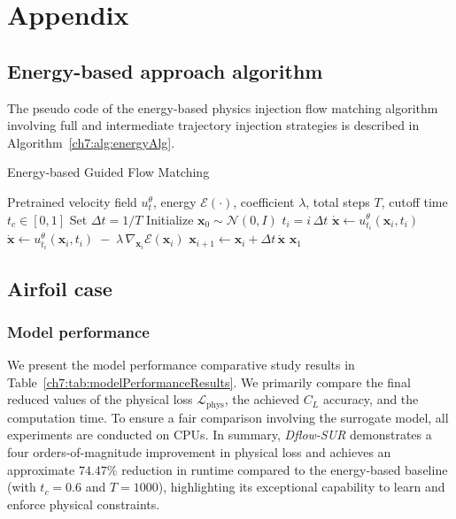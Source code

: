 \section{Appendix}
\subsection{Energy-based approach algorithm}
\label{ch7:sect:App_energyBasedAlg}

The pseudo code of the energy-based physics injection flow matching algorithm involving full and intermediate trajectory injection strategies is described in Algorithm~\ref{ch7:alg:energyAlg}.

\begin{algorithm}[H]
\caption{Energy-based Guided Flow Matching}
\begin{algorithmic}[1]
\Require Pretrained velocity field $u_t^\theta$, energy $\mathcal{E}(\cdot)$, coefficient $\lambda$, total steps $T$, cutoff time $t_c\in[0,1]$
\State Set $\Delta t = 1/T$
\State Initialize $\mathbf{x}_0 \sim \mathcal{N}(0,I)$
    \State $t_i = i\,\Delta t$
        \State $\dot{\mathbf{x}} \leftarrow u_{t_i}^\theta(\mathbf{x}_i, t_i)$
    \Else
        \State $\dot{\mathbf{x}} \leftarrow u_{t_i}^\theta(\mathbf{x}_i, t_i)\;-\;\lambda\,\nabla_{\mathbf{x}_i}\mathcal{E}(\mathbf{x}_i)$
    \EndIf
    \State $\mathbf{x}_{i+1} \leftarrow \mathbf{x}_i + \Delta t\,\dot{\mathbf{x}}$
\EndFor
\State \Return $\mathbf{x}_1$
\end{algorithmic}
\label{ch7:alg:energyAlg}
\end{algorithm}


\subsection{Airfoil case}
\subsubsection{Model performance}
\label{ch7:subsect:modelPerformance}
We present the model performance comparative study results in Table~\ref{ch7:tab:modelPerformanceResults}. We primarily compare the final reduced values of the physical loss $\mathcal{L}_{\mathrm{phys}}$, the achieved $C_{L}$ accuracy, and the computation time. To ensure a fair comparison involving the surrogate model, all experiments are conducted on CPUs. In summary, \textit{Dflow-SUR} demonstrates a four orders-of-magnitude improvement in physical loss and achieves an approximate $74.47\%$ reduction in runtime compared to the energy-based baseline (with $t_c = 0.6$ and $T = 1000$), highlighting its exceptional capability to learn and enforce physical constraints.

